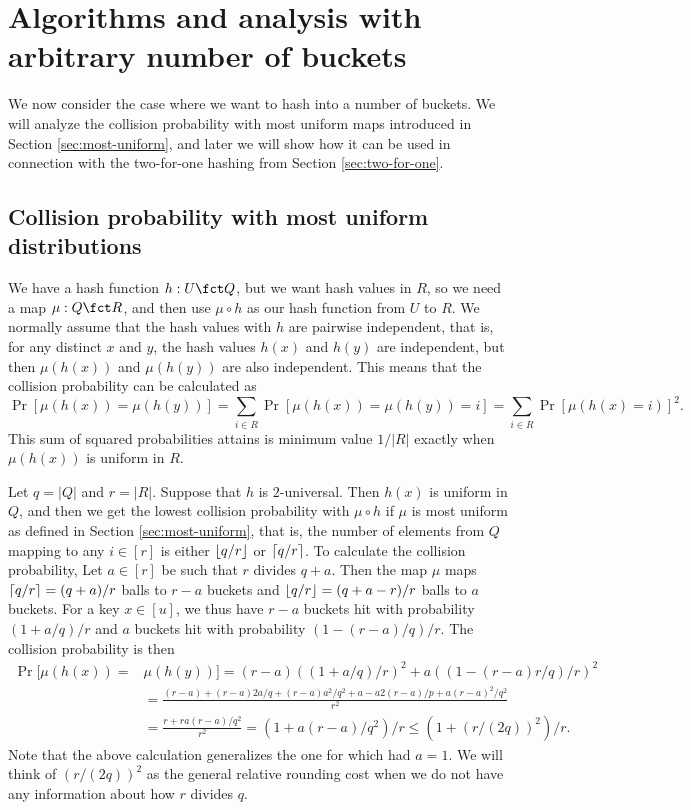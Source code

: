 
\section{Algorithms and analysis with arbitrary number of buckets}
We now consider the case where we want to hash into
a number of buckets. We will analyze the collision probability
with most uniform maps introduced in Section \ref{sec:most-uniform},
and later we will show how it can be used in connection with the
two-for-one hashing from Section \ref{sec:two-for-one}.

\subsection{Collision probability with most uniform distributions}
We have a hash function $h:U\fct Q$, but we want hash values in $R$, so
we need a map $\mu:Q\fct R$, and then use $\mu\circ h$ as
our hash function from $U$ to $R$. We normally assume that the hash values 
with $h$ are pairwise independent, that is, for any distinct $x$ and $y$,
the hash values $h(x)$ and $h(y)$ are independent, but then 
$\mu(h(x))$ and $\mu(h(y))$ are also independent. This means
that the collision probability can be calculated
as 
\[\Pr[\mu(h(x))=\mu(h(y))]=\sum_{i\in R}\Pr[\mu(h(x))=\mu(h(y))=i]=\sum_{i\in R}\Pr[\mu(h(x)=i)]^2.\]
This sum of squared probabilities attains is minimum value $1/|R|$
exactly when $\mu(h(x))$ is uniform in $R$. 

Let $q=|Q|$ and $r=|R|$. Suppose that $h$ is $2$-universal. Then
$h(x)$ is uniform in $Q$, and then we get the lowest collision
probability with $\mu\circ h$ if $\mu$ is most uniform as defined in
Section \ref{sec:most-uniform}, that is, the number of elements from
$Q$ mapping to any $i\in[r]$ is either $\lfloor {q/r} \rfloor$ or
$\lceil {q/r}\rceil$. To calculate the collision probability,
Let $a\in[r]$ be such that $r$ divides $q+a$. Then the map $\mu$ maps
$\lceil {q/r}\rceil=(q+a)/r$ balls to $r-a$ buckets and
$\lfloor {q/r} \rfloor=(q+a-r)/r$ balls to $a$ buckets. For a key $x\in [u]$, we
thus have $r-a$ buckets hit with probability $(1+a/q)/r$ and
$a$ buckets hit with probability $(1-(r-a)/q)/r$.
The collision probability is then
\begin{align}
\Pr[\mu(h(x))=&\mu(h(y))]= (r-a)((1+a/q)/r)^2+a((1-(r-a)r/q)/r)^2\nonumber\\
  &=\frac{(r-a)+(r-a)2a/q+(r-a)a^2/q^2+ a-a2(r-a)/p+a(r-a)^2/q^2}{r^2}\nonumber\\
  &=\frac{r +r a (r-a)/q^2}{r^2}=(1+a(r-a)/q^2)/r\leq \left(1+(r/(2q))^2\right)/r.\label{eq:coll-a}
  \end{align}
Note that the above calculation generalizes the one for  which
had $a=1$. We will think of $(r/(2q))^2$ as the general relative rounding
cost when we do not have any information about how $r$ divides $q$.

